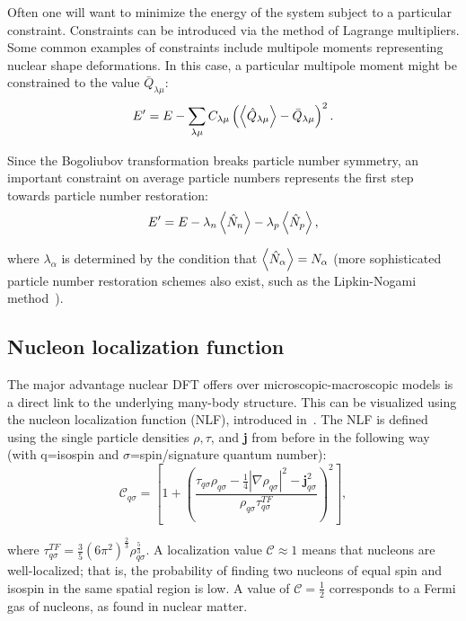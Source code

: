 
Often one will want to minimize the energy of the system subject to a particular constraint. Constraints can be introduced via the method of Lagrange multipliers. Some common examples of constraints include multipole moments representing nuclear shape deformations. In this case, a particular multipole moment might be constrained to the value $\bar{Q}_{\lambda\mu}$:
\begin{equation}\label{eq:routhian}
E' = E - \sum_{\lambda\mu} C_{\lambda\mu} \left(\expval{\hat{Q}_{\lambda\mu}} - \bar{Q}_{\lambda\mu}\right)^2.
\end{equation}

\noindent Since the Bogoliubov transformation breaks particle number symmetry, an important constraint on average particle numbers represents the first step towards particle number restoration:
\begin{equation}
E' = E - \lambda_n \expval{\hat{N}_n} - \lambda_p \expval{\hat{N}_p},
\end{equation}

\noindent where $\lambda_\alpha$ is determined by the condition that $\expval{\hat{N}_\alpha} = N_\alpha$ (more sophisticated particle number restoration schemes also exist, such as the Lipkin-Nogami method~\cite{Lipkin1960, Nogami1964, Pradhan1973, Flocard1997}). %

\subsection{Nucleon localization function}\label{sect:locali}
The major advantage nuclear DFT offers over microscopic-macroscopic models is a direct link to the underlying many-body structure. This can be visualized using the nucleon localization function (NLF), introduced in~\cite{Reinhard2011,Zhang2016}. The NLF is defined using the single particle densities $\rho, \tau$, and \textbf{j} from before in the following way (with q=isospin and $\sigma$=spin/signature quantum number):
\begin{equation}
\mathcal{C}_{q\sigma} = \left[1+\left(\frac{\tau_{q\sigma}\rho_{q\sigma}-\frac{1}{4}|\nabla\rho_{q\sigma}|^2-\mathbf{j}^2_{q\sigma}}{\rho_{q\sigma}\tau_{q\sigma}^{TF}}\right)^2\right],
\end{equation}

\noindent where $\tau_{q\sigma}^{TF}=\frac{3}{5}(6\pi^2)^\frac{2}{3}\rho_{q\sigma}^\frac{5}{3}$. A localization value $\mathcal{C} \approx 1$ means that nucleons are well-localized; that is, the probability of finding two nucleons of equal spin and isospin in the same spatial region is low. A value of $\mathcal{C}=\frac{1}{2}$ corresponds to a Fermi gas of nucleons, as found in nuclear matter.

